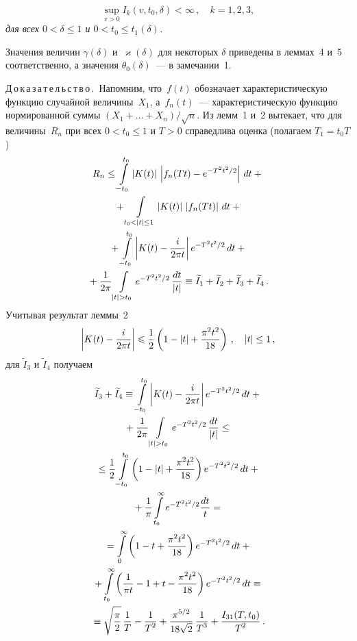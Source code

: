 \begin{multicols}{2}
\noindent
$$
\sup_{v>0}I_k(v,t_0,\delta)<\infty\,,\quad k=1, 2, 3,
$$
\textit{для всех  $0<\delta\le1$ и $0<t_0\le t_1(\delta)$.
}


Значения величин $\gamma(\delta)$ и~$\varkappa(\delta)$ для некоторых $\delta$
приведены в леммах~4 и~5 соответственно, а значения $\theta_0(\delta)$~--- в
замечании~1.

\smallskip

\noindent
Д\,о\,к\,а\,з\,а\,т\,е\,л\,ь\,с\,т\,в\,о\,.\
Напомним, что~$f(t)$ обозначает характеристическую функцию случайной
величины~$X_1$, а~$f_n(t)$~--- характеристическую функцию
нормированной суммы ${(X_1+\ldots+X_n)/\sqrt n}$. Из
лемм~1 и~2 вытекает,
что для величины~$R_n$ при всех ${0<t_0\le1}$ и $T>0$ справедлива
оценка (полагаем $T_1=t_0T$)
\begin{multline*}
R_n\le \int\limits_{-t_0}^{t_0}{\left|K(t)\right|\,\left|f_n(Tt)-e^{-T^2t^2/2}\right|\,dt}+{}\\
{}+\int\limits_{t_0<|t|\le1}{\left|K(t)\right|\,\left|f_n(Tt)\right|\,dt}+{}\\
{}+\int\limits_{-t_0}^{t_0}{\left|K(t)-\fr {i}{2\pi t}\right|e^{-T^2t^2/2}\,dt}+{}\\
{}+ \fr{1}{2\pi}
\int\limits_{|t|>t_0}{e^{-T^2t^2/2}\,\fr{dt}{|t|}}\equiv
\widetilde I_1+ \widetilde I_2+\widetilde I_3+\widetilde I_4\,.
\end{multline*}
Учитывая результат леммы~2
$$
\left| K(t)-\displaystyle\frac{\displaystyle i\mathstrut}{\displaystyle 2\pi t\mathstrut}\right| \leqslant \displaystyle\frac{\displaystyle 1\mathstrut}{\displaystyle 2\mathstrut}\left(1-|t|+
\displaystyle\frac{\displaystyle \pi^2t^2\mathstrut}{\displaystyle 18\mathstrut}\right)\,,\quad |t|\le1\,,
$$
для $\widetilde I_3$ и $\widetilde I_4$ получаем
\begin{multline*}
\widetilde I_3+\widetilde I_4\equiv \int\limits_{-t_0}^{t_0}{\left|K(t)-\fr{i}{2\pi
t}\right|e^{-T^2t^2/2}\,dt}+{}\\
{}+
 \fr{1}{2\pi} \int\limits_{|t|>t_0}{e^{-T^2t^2/2}\,\fr{dt}{|t|}}\le{}\\
{}\le\fr{1}{2}\int\limits_{-t_0}^{t_0} {\left(1-|t|+\fr{\pi^2t^2}{18}\right)
e^{-T^2t^2/2}\,dt}+{}\\
{}+
\fr{1}{\pi}\int\limits_{t_0}^{\infty}e^{-T^2t^2/2}\fr{dt}{t}={}\\
{}=\int\limits_0^\infty {\left(1-t+\fr{\pi^2t^2}{18}\right) e^{-T^2t^2/2}\,dt}+ {}\\
{}+
\int\limits_{t_0}^{\infty}\left(\fr{1}{\pi t}-1+
t-\fr{\pi^2t^2}{18}\right)e^{-T^2t^2/2}\,dt\equiv {}\\
{}\equiv \sqrt{\fr{\pi}{2}}\,\fr{1}{T}-\fr{1}{T^2}+
\fr{\pi^{5/2}}{18\sqrt2}\,\fr{1}{T^3}+\fr{I_{31}(T,t_0)}{T^2}\,.
\end{multline*}


\end{multicols}
